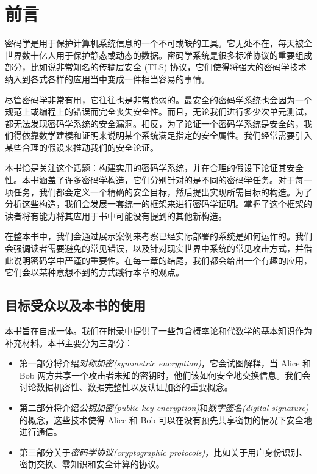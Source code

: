 \chapter*{前言}

密码学是用于保护计算机系统信息的一个不可或缺的工具。它无处不在，每天被全世界数十亿人用于保护静态或动态的数据。密码学系统是很多标准协议的重要组成部分，比如说非常知名的传输层安全 (TLS) 协议，它们使得将强大的密码学技术纳入到各式各样的应用当中变成一件相当容易的事情。

尽管密码学非常有用，它往往也是非常脆弱的。最安全的密码学系统也会因为一个规范上或编程上的错误而完全丧失安全性。而且，无论我们进行多少次单元测试，都无法发现密码学系统的安全漏洞。相反，为了论证一个密码学系统是安全的，我们得依靠数学建模和证明来说明某个系统满足指定的安全属性。我们经常需要引入某些合理的假设来推动我们的安全论证。

本书恰是关注这个话题：构建实用的密码学系统，并在合理的假设下论证其安全性。本书涵盖了许多密码学构造，它们分别针对的是不同的密码学任务。对于每一项任务，我们都会定义一个精确的安全目标，然后提出实现所需目标的构造。为了分析这些构造，我们会发展一套统一的框架来进行密码学证明。掌握了这个框架的读者将有能力将其应用于书中可能没有提到的其他新构造。

在整本书中，我们会通过展示案例来考察已经实际部署的系统是如何运作的。我们会强调读者需要避免的常见错误，以及针对现实世界中系统的常见攻击方式，并借此说明密码学中严谨的重要性。在每一章的结尾，我们都会给出一个有趣的应用，它们会以某种意想不到的方式践行本章的观点。

\section*{目标受众以及本书的使用}

本书旨在自成一体。我们在附录中提供了一些包含概率论和代数学的基本知识作为补充材料。本书主要分为三部分：
\begin{itemize}
	\item 第一部分将介绍\emph{对称加密(symmetric encryption)}，它会试图解释，当 Alice 和 Bob 两方共享一个攻击者未知的密钥时，他们该如何安全地交换信息。我们会讨论数据机密性、数据完整性以及认证加密的重要概念。
	\item 第二部分将介绍\emph{公钥加密(public-key encryption)}和\emph{数字签名(digital signature)}的概念，这些技术使得 Alice 和 Bob 可以在没有预先共享密钥的情况下安全地进行通信。
	\item 第三部分关于\emph{密码学协议(cryptographic protocols)}，比如关于用户身份识别、密钥交换、零知识和安全计算的协议。
\end{itemize}

